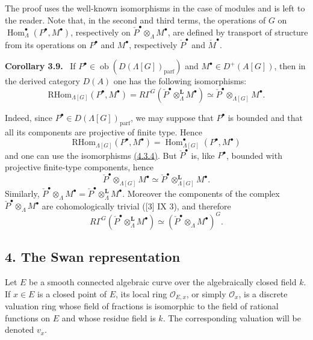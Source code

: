 \documentclass[11pt]{article}
\newenvironment{statement}[1]{\par\medskip\noindent\textbf{#1.}\ }{\par\medskip}
\DeclareMathOperator{\Hom}{Hom}
\providecommand{\RHom}{\mathrm{RHom}}
\providecommand{\parf}{\mathrm{parf}}
\providecommand{\Ob}{\operatorname{ob}}
\providecommand{\RHom}{\mathrm{RHom}}
\providecommand{\Hom}{\operatorname{Hom}}
\providecommand{\RHom}{\mathrm R\mathcal{H}om}
\providecommand{\Ob}{\operatorname{ob}}
\providecommand{\Ob}{\operatorname{Ob}}
\providecommand{\parf}{\mathrm{parf}}
\providecommand{\RHom}{\mathrm{RHom}}
\providecommand{\Hom}{\operatorname{Hom}}
\providecommand{\Ob}{\operatorname{ob}}
\providecommand{\Ob}{\operatorname{Ob}}
\begin{document}
The proof uses the well-known isomorphisms in the case of modules and is left to the reader. Note that, in the second and third terms, the operations of $G$ on $\Hom_\Lambda^\bullet(P^\bullet,M^\bullet)$, respectively on $\check P^\bullet\otimes_\Lambda M^\bullet$, are defined by transport of structure from its operations on $P^\bullet$ and $M^\bullet$, respectively $\check P^\bullet$ and $\check M^\bullet$.

\label{sga5:X:corollary:3.9}\begin{statement}{Corollary 3.9}
If $P^\bullet\in\Ob(D(\Lambda[G])_{\parf})$ and $M^\bullet\in D^+(A[G])$, then in the derived category $D(A)$ one has the following isomorphisms:
\[
\RHom_{\Lambda[G]}(P^\bullet,M^\bullet)
=R\Gamma^G(\check P^\bullet\otimes_\Lambda^{\mathbf L}M^\bullet)
\simeq \check P^\bullet\otimes_{\Lambda[G]}M^\bullet.
\tag{3.9.1}\label{sga5:X:equation:3.9.1}
\]
\end{statement}

Indeed, since $P^\bullet\in D(\Lambda[G])_{\parf}$, we may suppose that $P^\bullet$ is bounded and that all its components are projective of finite type. Hence
\[
\RHom_{\Lambda[G]}(P^\bullet,M^\bullet)=\Hom_{\Lambda[G]}^\bullet(P^\bullet,M^\bullet)
\]
and one can use the isomorphisms \hyperref[sga5:X:equation:3.8.1]{(4.3.4)}. But $\check P^\bullet$ is, like $P^\bullet$, bounded with projective finite-type components, hence
\[
\check P^\bullet\otimes_{\Lambda[G]}M^\bullet\simeq
\check P^\bullet\otimes_{\Lambda[G]}^{\mathbf L}M^\bullet.
\]
Similarly, $\check P^\bullet\otimes_\Lambda M^\bullet=\check P^\bullet\otimes_\Lambda^{\mathbf L}M^\bullet$. Moreover the components of the complex $\check P^\bullet\otimes_\Lambda M^\bullet$ are cohomologically trivial ([3] IX 3), and therefore
\[
R\Gamma^G(\check P^\bullet\otimes_\Lambda^{\mathbf L}M^\bullet)
\simeq (\check P^\bullet\otimes_\Lambda M^\bullet)^G.
\]

\subsection*{4. The Swan representation}\label{sga5:X:subsection:4}

Let $E$ be a smooth connected algebraic curve over the algebraically closed field $k$. If $x\in E$ is a closed point of $E$, its local ring $\mathcal O_{E,x}$, or simply $\mathcal O_x$, is a discrete valuation ring whose field of fractions is isomorphic to the field of rational functions on $E$ and whose residue field is $k$. The corresponding valuation will be denoted $v_x$.
\end{document}
